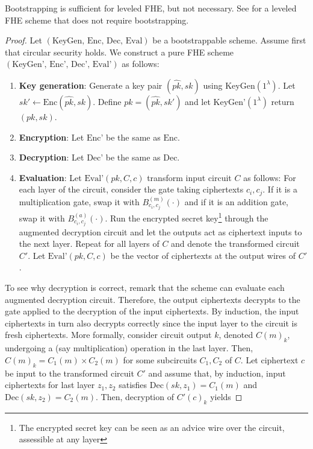 \begin{remark}
    Bootstrapping is sufficient for leveled FHE, but not necessary. See \cite{BGV12-no-bootstrap} for a leveled FHE scheme that does not require bootstrapping.
\end{remark}
\begin{proof}
Let $(\text{KeyGen, Enc, Dec, Eval})$ be a bootstrappable scheme. Assume first that circular security holds. We construct a pure FHE scheme $(\text{KeyGen', Enc', Dec', Eval'})$ as follows:
    \begin{enumerate}
        \item \textbf{Key generation}: Generate a key pair $(\hat{pk},sk)$ using $\text{KeyGen}(1^{\lambda})$. Let $sk' \leftarrow \text{Enc}(\hat{pk},sk)$. Define $pk = (\hat{pk}, sk')$ and let $\text{KeyGen'}(1^{\lambda})$ return $(pk,sk)$.
        \item \textbf{Encryption}: Let $\text{Enc'}$ be the same as $\text{Enc}$.
        \item \textbf{Decryption}: Let $\text{Dec'}$ be the same as $\text{Dec}$.
        \item \textbf{Evaluation}: Let $\text{Eval'}(pk, C, c)$ transform input circuit $C$ as follows: For each layer of the circuit, consider the gate taking ciphertexts $c_i, c_j$. If it is a multiplication gate, swap it with $B_{c_i,c_j}^{(m)}(\cdot)$ and if it is an addition gate, swap it with $B_{c_i,c_j}^{(a)}(\cdot)$. Run the encrypted secret key\footnote{The encrypted secret key can be seen as an advice wire over the circuit, assessible at any layer} through the augmented decryption circuit and let the outputs act as ciphertext inputs to the next layer. Repeat for all layers of $C$ and denote the transformed circuit $C'$. Let $\text{Eval'}(pk, C, c)$ be the vector of ciphertexts at the output wires of $C'$.
    \end{enumerate}
To see why decryption is correct, remark that the scheme can evaluate each augmented decryption circuit. Therefore, the output ciphertexts decrypts to the gate applied to the decryption of the input ciphertexts. By induction, the input ciphertexts in turn also decrypts correctly since the input layer to the circuit is fresh ciphertexts. More formally, consider circuit output $k$, denoted $C(m)_k$, undergoing a (say multiplication) operation in the last layer. Then, $C(m)_k = C_1(m) \times C_2(m)$ for some subcircuits $C_1, C_2$ of $C$. Let ciphertext $c$ be input to the transformed circuit $C'$ and assume that, by induction, input ciphertexts for last layer $z_1, z_2$ satisfies $\text{Dec}(sk,z_1) = C_1(m)$ and $\text{Dec}(sk,z_2) = C_2(m)$. Then, decryption of $C'(c)_k$ yields

\end{proof}
